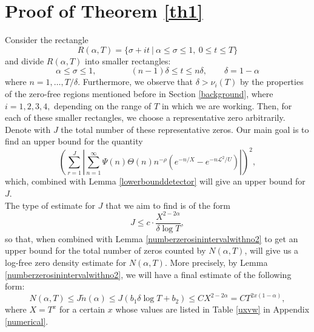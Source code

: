 \documentclass[reqno]{amsart}
\numberwithin{equation}{section}
\theoremstyle{remark}
\begin{document}
\section{Proof of Theorem \ref{th1}}
Consider the rectangle 
\[
R(\alpha,T)=\{\sigma+it\ |\ \alpha\le\sigma\le 1,\ 0\le t\le T\}
\]
and divide $R(\alpha,T)$ into smaller rectangles:
\begin{equation}\label{rectangles}
\alpha\le \sigma\le 1,\qquad\qquad (n-1)\delta\le t\le n\delta,\qquad \delta=1-\alpha    
\end{equation}
where $n=1,\dots, T/\delta$. Furthermore, we observe that $\delta>\nu_i(T)$ by the properties of the zero-free regions mentioned before in Section \ref{background}, where $i=1,2,3,4,$ depending on the range of $T$ in which we are working. Then, for each of these smaller rectangles, we choose a representative zero arbitrarily.\\
Denote with $J$ the total number of these representative zeros. 
Our main goal is to find an upper bound for the quantity
\begin{equation}\label{principal}
    \left(\sum_{r=1}^J\left|\sum_{n=1}^\infty\Psi(n)\Theta(n) n^{-\rho}\left(e^{-n / X}-e^{-n\mathscr{L}^2/U}\right)\right|\right)^2,
\end{equation}
which, combined with Lemma \ref{lowerbounddetector} will give an upper bound for $J$.\\
The type of estimate for $J$ that we aim to find is of the form 
\begin{equation*}
    J\le c\cdot \frac{X^{2-2\alpha}}{\delta\log T},
\end{equation*}
so that, when combined with Lemma \ref{numberzerosinintervalwithno2} to get an upper bound for the total number of zeros counted by $N(\alpha,T)$, will give us a log-free zero density estimate for $N(\alpha,T)$. More precisely, by Lemma \ref{numberzerosinintervalwithno2}, we will have a final estimate of the following form:
\begin{equation*}
    N(\alpha,T)\le J \tilde{n}(\alpha)\le J (b_1\delta\log T+b_2)\le CX^{2-2\alpha}=C T^{2x(1-\alpha)},
\end{equation*}
where $X=T^x$ for a certain $x$ whose values are listed in Table \ref{uxvw} in Appendix \ref{numerical}.\\
\end{document}
